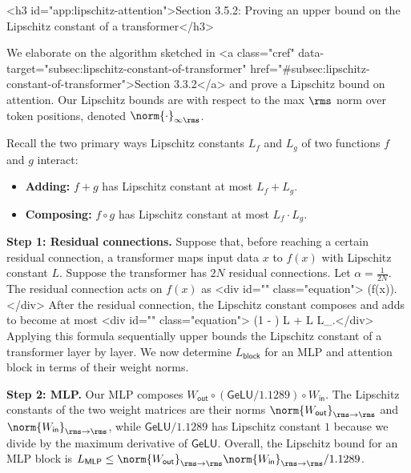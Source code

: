 <h3 id="app:lipschitz-attention">Section 3.5.2: Proving an upper bound on the Lipschitz constant of a transformer</h3>

We elaborate on the algorithm sketched in <a class="cref" data-target="subsec:lipschitz-constant-of-transformer" href="#subsec:lipschitz-constant-of-transformer">Section 3.3.2</a> and prove a Lipschitz bound on attention. Our Lipschitz bounds are with respect to the max $\rms$ norm over token positions, denoted $\norm{\cdot}_{\infty\rms}$.

Recall the two primary ways Lipschitz constants $L_f$ and $L_g$ of two functions $f$ and $g$ interact:
\begin{itemize}
    \item \textbf{Adding:} $f + g$ has Lipschitz constant at most $L_f + L_g$.
    \item \textbf{Composing:} $f \circ g$ has Lipschitz constant at most $L_f \cdot L_g$.
\end{itemize}

\textbf{Step 1: Residual connections.} Suppose that, before reaching a certain residual connection, a transformer maps input data $x$ to $f(x)$ with Lipschitz constant $L$. Suppose the transformer has $2N$ residual connections. Let $\alpha = \tfrac{1}{2N}$. The residual connection acts on $f(x)$ as <div id="" class="equation">    (f(x)).</div> After the residual connection, the Lipschitz constant composes and adds to become at most <div id="" class="equation">    (1 - \alpha) \cdot L + \alpha \cdot L \cdot L_.</div> Applying this formula sequentially upper bounds the Lipschitz constant of a transformer layer by layer. We now determine $L_\mathsf{block}$ for an MLP and attention block in terms of their weight norms.

\textbf{Step 2: MLP.} Our MLP composes $W_\mathsf{out} \circ (\mathsf{GeLU} / 1.1289) \circ W_\mathsf{in}$. The Lipschitz constants of the two weight matrices are their norms $\norm{W_\mathsf{out}}_{\rms\to\rms}$ and $\norm{W_\mathsf{in}}_{\rms\to\rms}$, while $\mathsf{GeLU} / 1.1289$ has Lipschitz constant $1$ because we divide by the maximum derivative of $\mathsf{GeLU}$. Overall, the Lipschitz bound for an MLP block is $L_\mathsf{MLP} \leq \norm{W_\mathsf{out}}_{\rms\to\rms} \norm{W_\mathsf{in}}_{\rms\to\rms} / 1.1289$.

